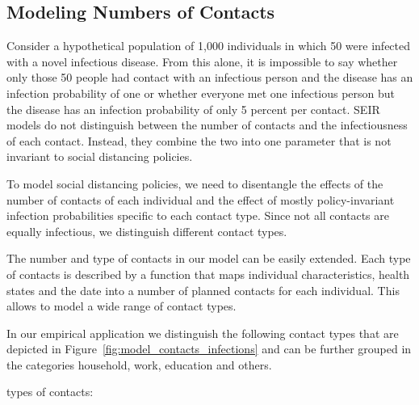 \subsection{Modeling Numbers of Contacts}
\label{sec:number_of_contacts}

Consider a hypothetical population of 1,000 individuals in which 50 were infected with a
novel infectious disease. From this alone, it is impossible to say whether only those 50
people had contact with an infectious person and the disease has an infection probability
of one or whether everyone met one infectious person but the disease has an infection
probability of only 5 percent per contact. SEIR models do not distinguish between the
number of contacts and the infectiousness of each contact. Instead, they combine the two
into one parameter that is not invariant to social distancing policies.

To model social distancing policies, we need to disentangle the effects of the number of
contacts of each individual and the effect of mostly policy-invariant infection
probabilities specific to each contact type. Since not all contacts are equally
infectious, we distinguish different contact types.

The number and type of contacts in our model can be easily extended. Each type of
contacts is described by a function that maps individual characteristics, health states
and the date into a number of planned contacts for each individual. This allows to model
a wide range of contact types.

In our empirical application we distinguish the following  contact types that
are depicted in Figure~\ref{fig:model_contacts_infections} and can be further grouped
in the categories household, work, education and others.

types of contacts:

